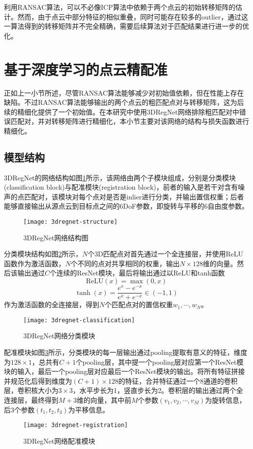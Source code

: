 利用RANSAC算法，可以不必像ICP算法中依赖于两个点云的初始转移矩阵的估计。然而，由于点云中部分特征的相似重叠，同时可能存在较多的outlier，通过这一算法得到的转移矩阵并不完全精确，需要后续算法对于匹配结果进行进一步的优化。

\section{基于深度学习的点云精配准}
正如上一小节所述，尽管RANSAC算法能够减少对初始值依赖，但在性能上存在缺陷。不过RANSAC算法能够输出的两个点云的粗匹配点对与转移矩阵，这为后续的精细化提供了一个初始值。在本研究中使用3DRegNet网络排除粗匹配对中错误匹配对，并对转移矩阵进行精细化，本小节主要对该网络的结构与损失函数进行精细化。
\subsection{模型结构}
3DRegNet的网络结构如图\ref{3dregnet-structure}所示，该网络由两个子模块组成，分别是分类模块(classification block)与配准模块(registration block)，前者的输入是若干对含有噪声的点匹配对，该模块对每个点对是否是inlier进行分类，并输出置信权重；后者能够直接输出从源点云到目标点之间的6DoF参数，即旋转与平移的6自由度参数。
\begin{figure}
	\centering
	\texttt{[image: 3dregnet-structure]}
	\caption{3DRegNet网络结构图}
	\label{3dregnet-structure}
\end{figure}

分类模块结构如图\ref{3dregnet-classification}所示，$N$个3D匹配点对首先通过一个全连接层，并使用ReLU函数作为激活函数，$N$个不同的点对共享相同的权重，输出$N\times 128$维的向量。然后该输出通过$C$个连续的ResNet模块\cite{he2016deep}，最后将输出通过以ReLU和tanh函数
\begin{equation}
	\text{ReLU}(x)=\max(0, x)
\end{equation}
\begin{equation}
	\tanh (x)=\frac{e^x-e^{-x}}{e^x+e^{-x}}\in (-1,1)
\end{equation}
作为激活函数的全连接层，得到$N$个匹配点对的置信权重$w_1,\cdots,w_N$。
\begin{figure}
	\centering
	\texttt{[image: 3dregnet-classification]}
	\caption{3DRegNet网络分类模块}
	\label{3dregnet-classification}
\end{figure}

配准模块如图\ref{3dregnet-registration}所示，分类模块的每一层输出通过pooling提取有意义的特征，维度为$128\times 1$，总共有$C+1$个pooling层，其中提一个pooling层对应第一个ResNet模块的输入，最后一个pooling层对应最后一个ResNet模块的输出。将所有特征拼接并规范化后得到维度为$(C+1)\times 128$的特征，合并特征通过一个8通道的卷积层，卷积核大小为$3\times 3$，水平步长为1，竖直步长为2。卷积层的输出通过两个全连接层，最终得到$M+3$维的向量，其中前$M$个参数$(v_1,v_2,\cdots,v_M)$为旋转信息，后3个参数$(t_1,t_2,t_3)$为平移信息。
\begin{figure}
	\centering
	\texttt{[image: 3dregnet-registration]}
	\caption{3DRegNet网络配准模块}
	\label{3dregnet-registration}
\end{figure}

